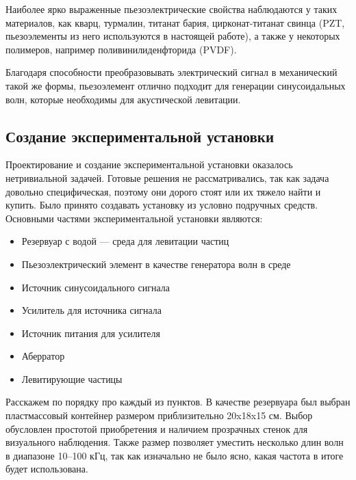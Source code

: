 Наиболее ярко выраженные пьезоэлектрические свойства наблюдаются у таких материалов, как кварц, турмалин, титанат бария, цирконат-титанат свинца (PZT, пьезоэлементы из него используются в настоящей работе), а также у некоторых полимеров, например поливинилиденфторида (PVDF).

Благодаря способности преобразовывать электрический сигнал в механический такой же формы, пьезоэлемент отлично подходит для генерации синусоидальных волн, которые необходимы для акустической левитации.
\subsection{Создание экспериментальной установки}
Проектирование и создание экспериментальной установки оказалось нетривиальной задачей. Готовые решения не рассматривались, так как задача довольно специфическая, поэтому они дорого стоят или их тяжело найти и купить. Было принято создавать установку из условно подручных средств. Основными частями экспериментальной установки являются:
\begin{itemize}
	\item Резервуар с водой --- среда для левитации частиц
	\item Пьезоэлектрический элемент в качестве генератора волн в среде
	\item Источник синусоидального сигнала
	\item Усилитель для источника сигнала
	\item Источник питания для усилителя
	\item Аберратор 
	\item Левитирующие частицы
\end{itemize}
Расскажем по порядку про каждый из пунктов. В качестве резервуара был выбран пластмассовый контейнер размером приблизительно 20x18x15 см. Выбор обусловлен простотой приобретения и наличием прозрачных стенок для визуального наблюдения. Также размер позволяет уместить несколько длин волн в диапазоне 10--100 кГц, так как изначально не было ясно, какая частота в итоге будет использована. 

